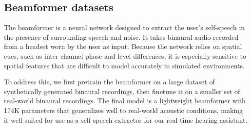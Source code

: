 


\subsection{Beamformer datasets }\label{sec:beamformerdatasets}



The beamformer is a neural network designed to extract the user's self-speech in the presence of surrounding speech and noise. It takes binaural audio recorded from a headset worn by the user as input. Because the network relies on spatial cues, such as inter-channel phase and level differences, it is especially sensitive to spatial features that are difficult to model accurately in simulated environments.

To address this, we first pretrain the beamformer on a large dataset of synthetically generated binaural recordings, then finetune it on a smaller set of real-world binaural recordings. The final model is a lightweight beamformer with 174K parameters that generalizes well to real-world acoustic conditions, making it well-suited for use as a self-speech extractor for our real-time hearing assistant.



